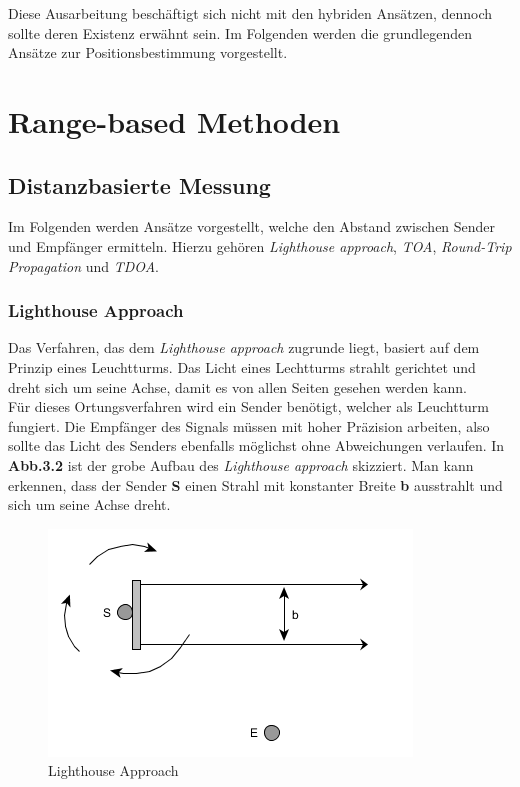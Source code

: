 \documentclass[12pt, a4wide]{scrreprt}
\begin{document}
Diese Ausarbeitung beschäftigt sich nicht mit den hybriden Ansätzen, dennoch sollte deren Existenz erwähnt sein. Im Folgenden werden die grundlegenden Ansätze zur Positionsbestimmung vorgestellt.

\chapter{Range-based Methoden}
  \section{Distanzbasierte Messung}
Im Folgenden werden Ansätze vorgestellt, welche den Abstand zwischen Sender und Empfänger ermitteln. Hierzu gehören \textit{Lighthouse approach}, \textit{\ac{TOA}}, \textit{Round-Trip Propagation} und \textit{\ac{TDOA}}.
    \subsection{Lighthouse Approach}
Das Verfahren, das dem \textit{Lighthouse approach}\cite{lighthouse} zugrunde liegt, basiert auf dem Prinzip eines Leuchtturms. Das Licht eines Lechtturms strahlt gerichtet und dreht sich um seine Achse, damit es von allen Seiten gesehen werden kann.\\
\indent
Für dieses Ortungsverfahren wird ein Sender benötigt, welcher als Leuchtturm fungiert. Die Empfänger des Signals müssen mit hoher Präzision arbeiten, also sollte das Licht des Senders ebenfalls möglichst ohne Abweichungen verlaufen. In {\bf Abb.3.2} ist der grobe Aufbau des \textit{Lighthouse approach} skizziert. Man kann erkennen, dass der Sender {\bf S} einen Strahl mit konstanter Breite {\bf b} ausstrahlt und sich um seine Achse dreht.\\

\begin{figure}[!htb]
\centering
\includegraphics[scale=.68]{lighthouse.png}
\caption{Lighthouse Approach}
\end{figure}
\end{document}
